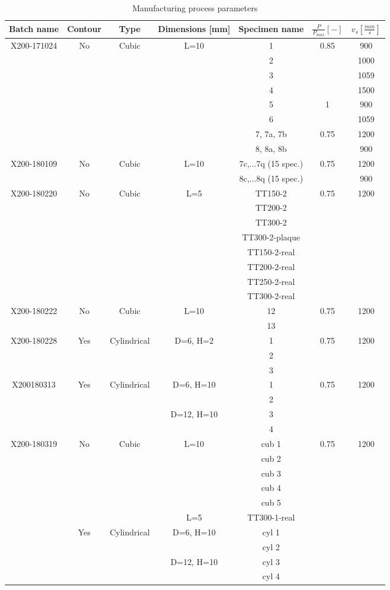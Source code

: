 \begin{table}[ht]
{\begin{tabular}{|c|c|c |c |c|c|c|}
    \hline
  Batch name & Contour & Type & Dimensions [mm] &Specimen name & $\frac{P}{P_{max}} [-]$ & $v_s [\frac{mm}{s}]$\\
  \hline
  \hline
  X200-171024 & No & Cubic & L=10& 1 & 0.85 & 900\\
  & &   & & 2 &  & 1000\\
  & &   & & 3&  & 1059\\
  & &  & & 4&  & 1500\\
  & &  & & 5& 1 & 900\\
  & &  & & 6&  & 1059\\
  & & & & 7, 7a, 7b & 0.75 & 1200\\
  & & & & 8, 8a, 8b& & 900\\
\hline  
  X200-180109 & No&Cubic & L=10 & 7c,...7q (15 spec.)& 0.75 &1200\\
  & & & & 8c,...8q (15 spec.)  & & 900\\
\hline  
  X200-180220 & No & Cubic & L=5 & TT150-2 & 0.75 & 1200\\
  & &  & & TT200-2 &  &\\
  & &  & & TT300-2 &  &\\
  & &  & & TT300-2-plaque &  &\\
  & &  & & TT150-2-real &  &\\
  & &  & & TT200-2-real &  &\\
  & &  & & TT250-2-real &  &\\
  & &  & & TT300-2-real &  &\\
\hline  
  X200-180222 & No & Cubic & L=10 &12& 0.75 & 1200\\
  & &  & &13 &  &\\
\hline  
  X200-180228  & Yes & Cylindrical & D=6, H=2 &1 & 0.75 & 1200\\
  & &  &  & 2&  & \\
  & &  &  & 3 &  & \\
\hline  
  X200180313 & Yes & Cylindrical & D=6, H=10&1& 0.75 & 1200\\
    & &    & &2 & &  \\
    & &  &D=12, H=10 &3& &  \\
    & & & &4 & & \\
\hline  
  X200-180319  & No & Cubic & L=10 & cub 1 & 0.75 & 1200\\
  & &  & & cub 2 & &\\
  & &  & & cub 3 & &\\
  & & & & cub 4 & &\\
  & & & & cub 5 & &\\
  & & &  L=5& TT300-1-real &  &\\ 
  & Yes &  Cylindrical & D=6, H=10&cyl 1   &  & \\
    & &  & &cyl 2 & & \\
    & &  & D=12, H=10 &cyl 3 & & \\
    & &  &  &cyl 4  & & \\

    \hline

\end{tabular}}
\caption[Manufacturing process parameters]{Manufacturing process parameters}
\label{table:Pparam}
\end{table}
